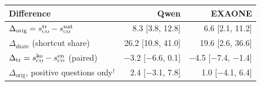 \begin{tabular}{@{}lrr@{}}
\toprule
Difference & Qwen & EXAONE \\
\midrule
$\Delta_{\mathrm{orig}} = s^{\mathrm{tr}}_{\textsc{co}} - s^{\mathrm{nat}}_{\textsc{co}}$ & 8.3 {\scriptsize[3.8, 12.8]} & 6.6 {\scriptsize[2.1, 11.2]} \\
$\Delta_{\mathrm{share}}$ (shortcut share) & 26.2 {\scriptsize[10.8, 41.0]} & 19.6 {\scriptsize[2.6, 36.6]} \\
$\Delta_{\mathrm{tr}} = s^{\mathrm{ko}}_{\textsc{co}} - s^{\mathrm{en}}_{\textsc{co}}$ (paired) & $-$3.2 {\scriptsize[$-$6.6, 0.1]} & $-$4.5 {\scriptsize[$-$7.4, $-$1.4]} \\
$\Delta_{\mathrm{orig}}$, positive questions only$^{\dagger}$ & 2.4 {\scriptsize[$-$3.1, 7.8]} & 1.0 {\scriptsize[$-$4.1, 6.4]} \\
\bottomrule
\end{tabular}
